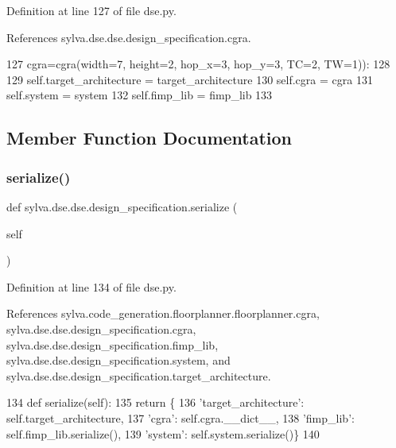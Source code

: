 Definition at line 127 of file dse.\+py.



References sylva.\+dse.\+dse.\+design\+\_\+specification.\+cgra.


\begin{DoxyCode}
127                  cgra=cgra(width=7, height=2, hop\_x=3, hop\_y=3, TC=2, TW=1)):
128 
129         self.target\_architecture = target\_architecture
130         self.cgra = cgra
131         self.system = system
132         self.fimp\_lib = fimp\_lib
133 
\end{DoxyCode}


\subsection{Member Function Documentation}
\mbox{\label{classsylva_1_1dse_1_1dse_1_1design__specification_add24965827d00b11032bd22aa2606169}} 
\subsubsection{\texorpdfstring{serialize()}{serialize()}}
{\footnotesize\ttfamily def sylva.\+dse.\+dse.\+design\+\_\+specification.\+serialize (\begin{DoxyParamCaption}\item[{}]{self }\end{DoxyParamCaption})}



Definition at line 134 of file dse.\+py.



References sylva.\+code\+\_\+generation.\+floorplanner.\+floorplanner.\+cgra, sylva.\+dse.\+dse.\+design\+\_\+specification.\+cgra, sylva.\+dse.\+dse.\+design\+\_\+specification.\+fimp\+\_\+lib, sylva.\+dse.\+dse.\+design\+\_\+specification.\+system, and sylva.\+dse.\+dse.\+design\+\_\+specification.\+target\+\_\+architecture.


\begin{DoxyCode}
134     \textcolor{keyword}{def }serialize(self):
135         \textcolor{keywordflow}{return} \{
136             \textcolor{stringliteral}{'target\_architecture'}: self.target\_architecture,
137             \textcolor{stringliteral}{'cgra'}: self.cgra.\_\_dict\_\_,
138             \textcolor{stringliteral}{'fimp\_lib'}: self.fimp\_lib.serialize(),
139             \textcolor{stringliteral}{'system'}: self.system.serialize()\}
140 
\end{DoxyCode}


